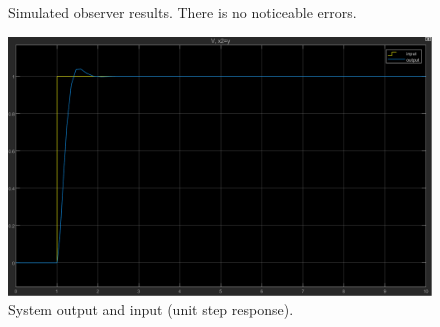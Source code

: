 \documentclass[12pt, oneside]{article}
\begin{document}
        \begin{figure}[htbp]
          \centering
          \hfill%
          \caption{Simulated observer results. There is no noticeable errors.}
        \end{figure}

\begin{figure}[htbp]
    \centering
    \includegraphics[width = \linewidth]{Report/pics/OutputResult1.png}
    \caption{System output and input (unit step response).}
    \label{fig:OutputResult1}
\end{figure}
\end{document}
